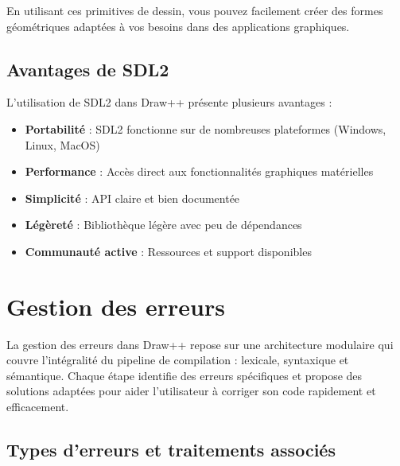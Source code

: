 \documentclass[12pt,a4paper]{report}
\begin{document}
En utilisant ces primitives de dessin, vous pouvez facilement créer des formes géométriques adaptées à vos besoins dans des applications graphiques.









\section{Avantages de SDL2}
L'utilisation de SDL2 dans Draw++ présente plusieurs avantages :
\begin{itemize}
    \item \textbf{Portabilité} : SDL2 fonctionne sur de nombreuses plateformes (Windows, Linux, MacOS)
    \item \textbf{Performance} : Accès direct aux fonctionnalités graphiques matérielles
    \item \textbf{Simplicité} : API claire et bien documentée
    \item \textbf{Légèreté} : Bibliothèque légère avec peu de dépendances
    \item \textbf{Communauté active} : Ressources et support disponibles
\end{itemize}



\chapter{Gestion des erreurs}

La gestion des erreurs dans Draw++ repose sur une architecture modulaire qui couvre l'intégralité du pipeline de compilation : lexicale, syntaxique et sémantique. Chaque étape identifie des erreurs spécifiques et propose des solutions adaptées pour aider l'utilisateur à corriger son code rapidement et efficacement.

\section{Types d'erreurs et traitements associés}
\end{document}
